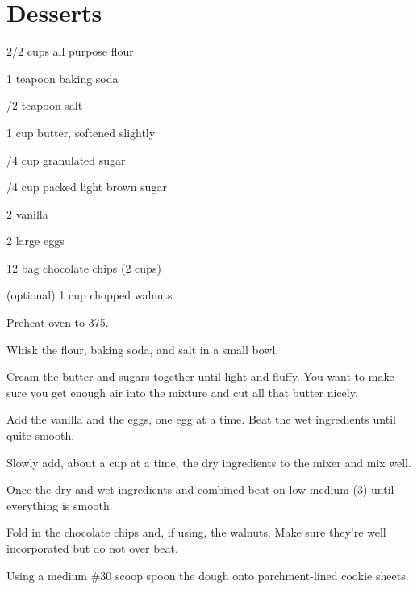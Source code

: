 \chapter{Desserts}


%
%
%
%
\newpage



\begin{IngredientsAndSteps}
    \ListIngredientsAndSteps
    {
        2/2 cups all purpose flour

        1 teapoon baking soda

        /2 teapoon salt

        \IngredientsSeparatorClear

        1 cup butter, softened slightly

        /4 cup granulated sugar

        /4 cup packed light brown sugar

        \IngredientsSeparatorClear

        2 \tsp[s] vanilla

        2 large eggs

        12 \Ounce bag chocolate chips (2 cups)

        (optional) 1 cup chopped walnuts
    }
    {
        Preheat oven to 375\Degrees[F].

        Whisk the flour, baking soda, and salt in a small bowl.

        Cream the butter and sugars together until light and fluffy. You want to make sure you get
        enough air into the mixture and cut all that butter nicely.

        Add the vanilla and the eggs, one egg at a time. Beat the wet ingredients until quite smooth.

        Slowly add, about a cup at a time, the dry ingredients to the mixer and mix well.

        Once the dry and wet ingredients and combined beat on low-medium (3) until
        everything is smooth.

        Fold in the chocolate chips and, if using, the walnuts. Make sure they're well
        incorporated but do not over beat.

        Using a medium \#30 scoop spoon the dough onto parchment-lined cookie sheets.
    }
\end{IngredientsAndSteps}

